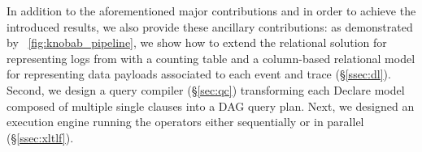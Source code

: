 In addition to the aforementioned major contributions and in order to achieve the introduced results, we also provide these ancillary contributions: as demonstrated by \figurename~\ref{fig:knobab_pipeline}, we show how to extend the relational solution for representing logs from \cite{Schonig15,SchonigRCJM16} with a counting table and a column-based relational model for representing data payloads associated to each event and trace (\S\ref{ssec:dl}). Second, we design a query compiler (\S\ref{sec:qc}) transforming each Declare model composed of multiple single clauses into a DAG query plan. Next, we designed an execution engine running the \xLTLf operators either sequentially or in parallel (\S\ref{ssec:xltlf}).